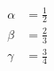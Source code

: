 \documentclass{article}
\begin{document}
\begin{align}
\alpha &= \frac{1}{2}\\
\beta  &= \frac{2}{3}\\
\gamma &= \frac{3}{4}
\end{align}
\end{document}
